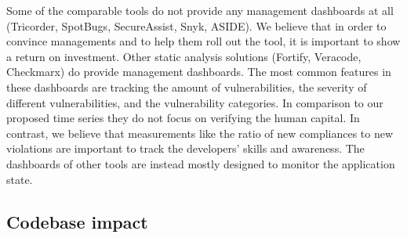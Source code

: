 Some of the comparable tools do not provide any management dashboards at all (Tricorder, SpotBugs, SecureAssist, Snyk, ASIDE). We believe that in order to convince managements and to help them roll out the tool, it is important to show a return on investment. Other static analysis solutions (Fortify, Veracode, Checkmarx) do provide management dashboards. The most common features in these dashboards are tracking the amount of vulnerabilities, the severity of different vulnerabilities, and the vulnerability categories. In comparison to our proposed time series they do not focus on verifying the human capital. In contrast, we believe that measurements like the ratio of new compliances to new violations are important to track the developers' skills and awareness. The dashboards of other tools are instead mostly designed to monitor the application state.

\subsection{Codebase impact}
\label{sec:codebase-impact}





